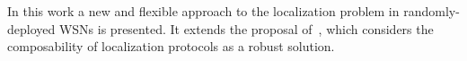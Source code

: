 




In this work a new and flexible approach to the localization problem in randomly-deployed WSNs is presented. It extends the proposal of~\cite{composability}, which considers the composability of localization protocols as a robust solution. 

